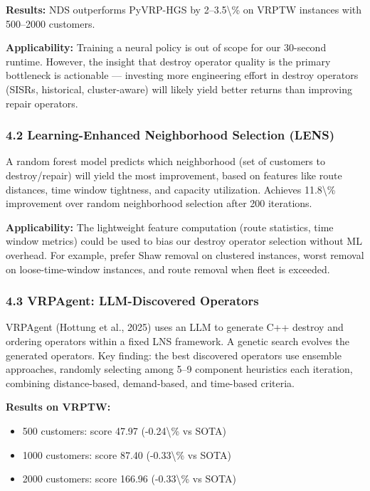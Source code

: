 \documentclass[twocolumn,10pt,letterpaper]{article}
\begin{document}
\textbf{Results:} NDS outperforms PyVRP-HGS by 2--3.5\textbackslash{}\% on VRPTW instances with 500--2000 customers.


\textbf{Applicability:} Training a neural policy is out of scope for our 30-second runtime. However, the insight that destroy operator quality is the primary bottleneck is actionable --- investing more engineering effort in destroy operators (SISRs, historical, cluster-aware) will likely yield better returns than improving repair operators.


\subsubsection{4.2 Learning-Enhanced Neighborhood Selection (LENS)}

A random forest model predicts which neighborhood (set of customers to destroy/repair) will yield the most improvement, based on features like route distances, time window tightness, and capacity utilization. Achieves 11.8\textbackslash{}\% improvement over random neighborhood selection after 200 iterations.


\textbf{Applicability:} The lightweight feature computation (route statistics, time window metrics) could be used to bias our destroy operator selection without ML overhead. For example, prefer Shaw removal on clustered instances, worst removal on loose-time-window instances, and route removal when fleet is exceeded.


\subsubsection{4.3 VRPAgent: LLM-Discovered Operators}

VRPAgent (Hottung et al., 2025) uses an LLM to generate C++ destroy and ordering operators within a fixed LNS framework. A genetic search evolves the generated operators. Key finding: the best discovered operators use ensemble approaches, randomly selecting among 5--9 component heuristics each iteration, combining distance-based, demand-based, and time-based criteria.


\textbf{Results on VRPTW:}

\begin{itemize}
\setlength{\itemsep}{0pt}
\setlength{\parskip}{0pt}
  \item 500 customers: score 47.97 (-0.24\textbackslash{}\% vs SOTA)
  \item 1000 customers: score 87.40 (-0.33\textbackslash{}\% vs SOTA)
  \item 2000 customers: score 166.96 (-0.33\textbackslash{}\% vs SOTA)
\end{itemize}
\end{document}
